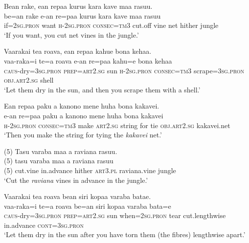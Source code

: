 \ea\label{ex:text22-26}
Bean rake, ean repaa kurus kara kave maa rasuu.\\
\gll be=an	rake	e-an	re=paa	kurus	kara	kave	maa	rasuu\\
     if=2\textsc{sg}.\textsc{pron}	want	\textsc{h}-2\textsc{sg}.\textsc{pron}	\textsc{consec}=\textsc{tm}3	cut.off	vine	net	hither	jungle\\
\glt `If you want, you cut net vines in the jungle.'
\z

\ea\label{ex:text22-27}
Vaarakai tea roava, ean repaa kahue bona kehaa.\\
\gll vaa-raka=i	te=a	roava	e-an	re=paa	kahu=e	bona	kehaa\\
     \textsc{caus}-dry=3\textsc{sg}.\textsc{pron}	\textsc{prep}=\textsc{art}2.\textsc{sg}	sun	\textsc{h}-2\textsc{sg}.\textsc{pron}	\textsc{consec}=\textsc{tm}3	scrape=3\textsc{sg}.\textsc{pron}	\textsc{obj}.\textsc{art}2.\textsc{sg}	shell\\
\glt `Let them dry in the sun, and then you scrape them with a shell.'
\z

\ea\label{ex:text22-28}
Ean repaa paku a kanono mene huha bona kakavei.\\
\gll e-an	re=paa	paku	a	kanono	mene	huha	bona	kakavei\\
     \textsc{h}-2\textsc{sg}.\textsc{pron}	\textsc{consec}=\textsc{tm}3	make	\textsc{art}2.\textsc{sg}	string	for	tie	\textsc{obj}.\textsc{art}2.\textsc{sg}	kakavei.net\\
\glt `Then you make the string for tying the \textit{kakavei} net.'
\z

\ea\label{ex:text22-29}
(5) Tasu varaba maa a raviana rasuu.\\
\gll (5)	tasu	varaba	maa	a	raviana	rasuu\\
     (5)	cut.vine	in.advance	hither	\textsc{art}3.\textsc{pl}	raviana.vine	jungle\\
\glt `Cut the \textit{raviana} vines in advance in the jungle.'
\z

\ea\label{ex:text22-30}
Vaarakai tea roava bean siri kopaa varaba batae.\\
\gll vaa-raka=i	te=a	roava	be=an	siri	kopaa	varaba	bata=e\\
     \textsc{caus}-dry=3\textsc{sg}.\textsc{pron}	\textsc{prep}=\textsc{art}2.\textsc{sg}	sun	when=2\textsc{sg}.\textsc{pron}	tear	cut.lengthwise	in.advance	\textsc{cont}=3\textsc{sg}.\textsc{pron}\\
\glt `Let them dry in the sun after you have torn them (the fibres) lengthwise apart.'
\z

